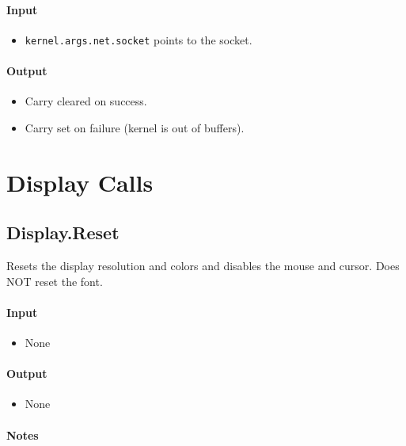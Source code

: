 \paragraph{Input}

\begin{itemize}
\item \verb+kernel.args.net.socket+ points to the socket.
\end{itemize}

\paragraph{Output}

\begin{itemize}
\item Carry cleared on success.
\item Carry set on failure (kernel is out of buffers).
\end{itemize}

\section*{Display Calls}

\subsection*{Display.Reset}
Resets the display resolution and colors and disables the mouse and cursor.  Does NOT reset the font.

\paragraph{Input}

\begin{itemize}
\item None
\end{itemize}

\paragraph{Output}

\begin{itemize}
\item None
\end{itemize}

\paragraph{Notes}

